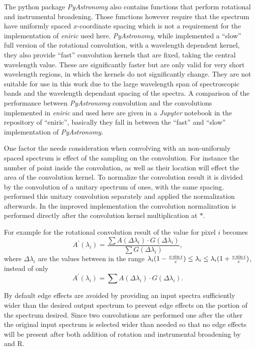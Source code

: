 The python package \emph{PyAstronomy} also contains functions that perform rotational and instrumental broadening.
Those functions however require that the spectrum have uniformly spaced $x$-coordinate spacing which is not a requirement for the implementation of \emph{eniric} used here. \emph{PyAstronomy}, while implemented a ``slow'' full version of the rotational convolution, with a wavelength dependent kernel, they also provide ``fast'' convolution kernels that are fixed, taking the central wavelength value.
These are significantly faster but are only valid for very short wavelength regions, in which the kernels do not significantly change.
They are not suitable for use in this work due to the large wavelength span of spectroscopic bands and the wavelength dependant spacing of the spectra.
A comparison of the performance between \emph{PyAstronomy} convolution and the convolutions implemented in \emph{eniric} and used here are given in a \emph{Jupyter} notebook in the repository of ``eniric'', basically they fall in between the ``fast'' and ``slow'' implementation of \emph{PyAstronomy}.

One factor the needs consideration when convolving with an non-uniformly spaced spectrum is effect of the sampling on the convolution.
For instance the number of point inside the convolution, as well as their location will effect the area of the convolution kernel.
To normalize the convolution result it is divided by the convolution of a unitary spectrum of ones, with the same spacing.
\citet{figueira_radial_2016} performed this unitary convolution separately and applied the normalization afterwards.
In the improved implementation the convolution normalization is performed directly after the convolution kernel multiplication at \(\textbf{*}\).

For example for the rotational convolution result of the value for pixel $i$ becomes
\[{A}^{\prime}(\lambda_{i}) =  \frac{\sum A(\Delta\lambda_{i}) \cdot G(\Delta\lambda_{i})}{\sum G(\Delta\lambda_{i})},\]
where $\Delta\lambda_{i}$ are the values between in the range $\lambda_{i} (1-\frac{v\sin{i}}{c}) \le\lambda_{i} \le \lambda_{i} (1+ \frac{v\sin{i}}{c})$,
instead of only
\[{A}^{\prime}(\lambda_{i}) =  \sum A(\Delta\lambda_{i}) \cdot G(\Delta\lambda_{i}).\]


By default edge effects are avoided by providing an input spectra sufficiently wider than the desired output spectrum to prevent edge effects on the portion of the spectrum desired.
Since two convolutions are performed one after the other the original input spectrum is selected wider than needed so that no edge effects will be present after both addition of rotation and instrumental broadening by \Vsini{} and R.

